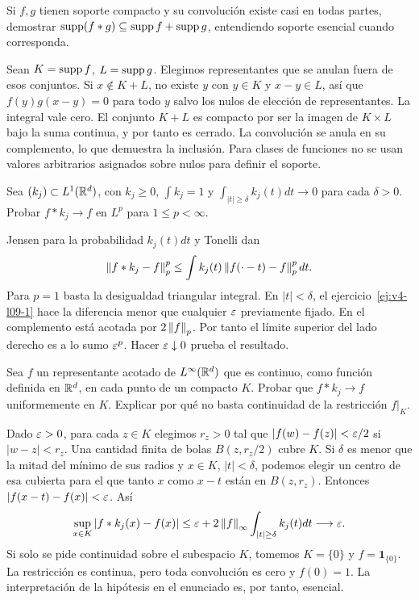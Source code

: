 \begin{ejercicio}\label{ej:v4-l09-3}
Si $f,g$ tienen soporte compacto y su convolución existe casi en todas partes, demostrar $\operatorname{supp}(f*g)\subseteq\operatorname{supp} f+\operatorname{supp} g$, entendiendo soporte esencial cuando corresponda.
\end{ejercicio}
\begin{solucion}
Sean $K=\operatorname{supp} f$, $L=\operatorname{supp} g$. Elegimos representantes que se anulan fuera de esos conjuntos. Si $x\notin K+L$, no existe $y$ con $y\in K$ y $x-y\in L$, así que $f(y)g(x-y)=0$ para todo $y$ salvo los nulos de elección de representantes. La integral vale cero. El conjunto $K+L$ es compacto por ser la imagen de $K\times L$ bajo la suma continua, y por tanto es cerrado. La convolución se anula en su complemento, lo que demuestra la inclusión. Para clases de funciones no se usan valores arbitrarios asignados sobre nulos para definir el soporte.
\end{solucion}

\begin{ejercicio}\label{ej:v4-l09-4}
Sea $(k_j)\subset L^1(\mathbb R^d)$, con $k_j\geq0$, $\int k_j=1$ y $\int_{|t|\geq\delta}k_j(t)dt\to0$ para cada $\delta>0$. Probar $f*k_j\to f$ en $L^p$ para $1\leq p<\infty$.
\end{ejercicio}
\begin{solucion}
Jensen para la probabilidad $k_j(t)dt$ y Tonelli dan
\[
 \left\lVert f*k_j-f\right\rVert_p^p\leq\int k_j(t)\left\lVert f(\cdot-t)-f\right\rVert_p^pdt.
\]
Para $p=1$ basta la desigualdad triangular integral. En $|t|<\delta$, el ejercicio~\ref{ej:v4-l09-1} hace la diferencia menor que cualquier $\varepsilon$ previamente fijado. En el complemento está acotada por $2\left\lVert f\right\rVert_p$. Por tanto el límite superior del lado derecho es a lo sumo $\varepsilon^p$. Hacer $\varepsilon\downarrow0$ prueba el resultado.
\end{solucion}

\begin{ejercicio}\label{ej:v4-l09-5}
Sea $f$ un representante acotado de $L^\infty(\mathbb R^d)$ que es continuo, como función definida en $\mathbb R^d$, en cada punto de un compacto $K$. Probar que $f*k_j\to f$ uniformemente en $K$. Explicar por qué no basta continuidad de la restricción $f|_K$.
\end{ejercicio}
\begin{solucion}
Dado $\varepsilon>0$, para cada $z\in K$ elegimos $r_z>0$ tal que $|f(w)-f(z)|<\varepsilon/2$ si $|w-z|<r_z$. Una cantidad finita de bolas $B(z,r_z/2)$ cubre $K$. Si $\delta$ es menor que la mitad del mínimo de sus radios y $x\in K$, $|t|<\delta$, podemos elegir un centro de esa cubierta para el que tanto $x$ como $x-t$ están en $B(z,r_z)$. Entonces $|f(x-t)-f(x)|<\varepsilon$. Así
\[
 \sup_{x\in K}|f*k_j(x)-f(x)|
 \leq\varepsilon+2\left\lVert f\right\rVert_\infty\int_{|t|\geq\delta}k_j(t)dt\longrightarrow\varepsilon.
\]
Si solo se pide continuidad sobre el subespacio $K$, tomemos $K=\{0\}$ y $f=\mathbf1_{\{0\}}$. La restricción es continua, pero toda convolución es cero y $f(0)=1$. La interpretación de la hipótesis en el enunciado es, por tanto, esencial.
\end{solucion}

